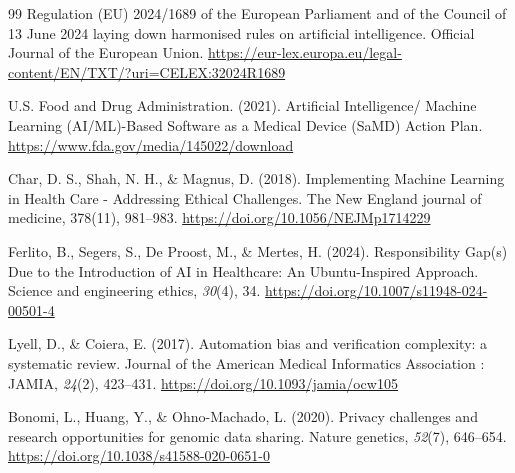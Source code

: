 \documentclass[10pt,a4paper]{article}
\begin{document}
\begin{thebibliography}{99}
     Regulation (EU) 2024/1689 of the European Parliament and of the Council of 13 June 2024 laying down harmonised rules on artificial intelligence. Official Journal of the European Union. \url{https://eur-lex.europa.eu/legal-content/EN/TXT/?uri=CELEX:32024R1689}

     U.S. Food and Drug Administration. (2021). Artificial Intelligence/ Machine Learning (AI/ML)-Based Software as a Medical Device (SaMD) Action Plan. \url{https://www.fda.gov/media/145022/download}

    \bibitem{} Char, D. S., Shah, N. H., \& Magnus, D. (2018). Implementing Machine Learning in Health Care - Addressing Ethical Challenges. The New England journal of medicine, 378(11), 981–983. \url{https://doi.org/10.1056/NEJMp1714229}

     Ferlito, B., Segers, S., De Proost, M., \& Mertes, H. (2024). Responsibility Gap(s) Due to the Introduction of AI in Healthcare: An Ubuntu-Inspired Approach. Science and engineering ethics, \textit{30}(4), 34. \url{https://doi.org/10.1007/s11948-024-00501-4}

     Lyell, D., \& Coiera, E. (2017). Automation bias and verification complexity: a systematic review. Journal of the American Medical Informatics Association : JAMIA, \textit{24}(2), 423–431. \url{https://doi.org/10.1093/jamia/ocw105}

 
     Bonomi, L., Huang, Y., \& Ohno-Machado, L. (2020). Privacy challenges and research opportunities for genomic data sharing. Nature genetics, \textit{52}(7), 646–654. \url{https://doi.org/10.1038/s41588-020-0651-0}


\end{thebibliography}
\end{document}
